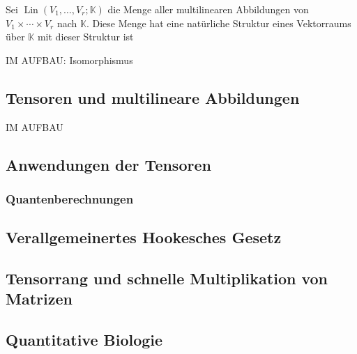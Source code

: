 \documentclass[
a4paper,landscape,16pt,
bibliography=totocnumbered,
numbers=noenddot,
]{scrartcl}
\numberwithin{equation}{subsection}
\newcommand{\N}{\mathbb N}
\newcommand{\R}{\mathbb R}
\newcommand{\K}{\mathbb K}
\newcommand{\lin}{\operatorname{lin}} %
\newcommand{\Lin}{\operatorname{Lin}} %
\theoremstyle{plain}
\theoremstyle{definition}
\begin{document}
Sei $\Lin(V_1,\ldots,V_r ; \K)$ die Menge aller multilinearen Abbildungen von $V_1 \times \cdots \times V_r$ nach $\K$.
Diese Menge hat eine natürliche Struktur eines Vektorraums über $\K$ mit dieser Struktur ist 

IM AUFBAU: Isomorphismus 

\subsection{Tensoren und multilineare Abbildungen} 

IM AUFBAU 


\subsection{Anwendungen der Tensoren} 

\subsubsection{Quantenberechnungen} 


\subsection{Verallgemeinertes Hookesches Gesetz} 

\subsection{ Tensorrang und schnelle Multiplikation von Matrizen} 

\subsection{Quantitative Biologie}


\end{document}
